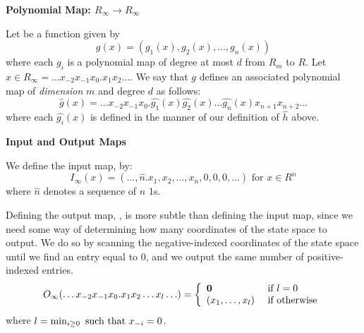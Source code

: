   \begin{definition}{\textbf{Polynomial Map: $R_\infty \rightarrow R_\infty$}}
    
    Let  be a function given by $$g(x) =
    (g_1(x), g_2(x), \ldots , g_n(x))$$ where each $g_i$ is a
    polynomial map of degree at most $d$ from $R_m$ to $R$.  Let $x
    \in R_\infty = \ldots x_{-2}x_{-1}x_0.x_1x_2 \ldots$. We say that
    $g$ defines an associated polynomial map
     of \emph{dimension} $m$
    and degree $d$ as follows:
    $$\widehat{g}(x) = 
    \ldots x_{-2}x_{-1}x_0.
    \widehat{g_1}(x)\widehat{g_2}(x)\ldots\widehat{g_n}(x)x_{n+1}x_{n+2}\ldots$$
    where each $\widehat{g_i}(x)$ is defined in the manner of our
    definition of $\widehat{h}$ above.
  \end{definition}
  
  \begin{definition} \textbf{Input and Output Maps}
    \label{def:io-map}
    
    We define the input map, 
    by:
    $$I_\infty(x) = 
    (\ldots, \widehat{n}.x_1,x_2,\ldots,x_n, 0,0,0,\ldots) \text{ for }
    x \in R^n$$ where $\widehat{n}$ denotes a sequence of $n$ $1$s.
    
    Defining the output map, ,
    is more subtle than defining the input map, since we need some way
    of determining how many coordinates of the state space to output.
    We do so by scanning the negative-indexed coordinates of the state
    space until we find an entry equal to $0$, and we output the same
    number of positive-indexed entries.
    $$O_\infty(\ldots x_{-2}x_{-1}x_0.x_1x_2\ldots x_l \ldots ) = 
    \left\{ \begin{array}{ll} \mathbf{0} & \text{ if } l = 0 \\ (x_1, \ldots, x_l) & \text{ if } \text{otherwise} \end{array} \right.
    $$
    where $l = \min_{i \geq 0} \text{ such that } x_{-i} = 0$.  
  \end{definition}

